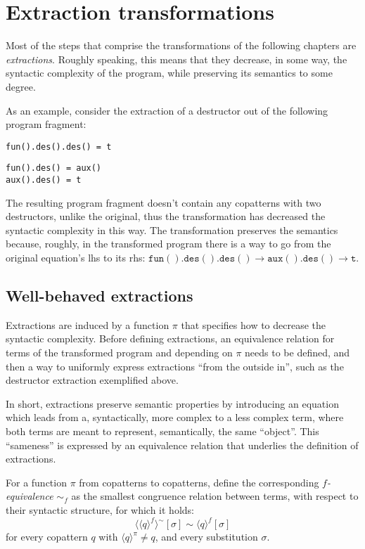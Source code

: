 \chapter{Extraction transformations}

Most of the steps that comprise the transformations of the following chapters are \textit{extractions}. Roughly speaking, this means that they decrease, in some way, the syntactic complexity of the program, while preserving its semantics to some degree.

As an example, consider the extraction of a destructor out of the following program fragment:
\begin{lstlisting}
fun().des().des() = t
\end{lstlisting}

\begin{lstlisting}
fun().des() = aux()
aux().des() = t
\end{lstlisting}
The resulting program fragment doesn't contain any copatterns with two destructors, unlike the original, thus the transformation has decreased the syntactic complexity in this way. The transformation preserves the semantics because, roughly, in the transformed program there is a way to go from the original equation's lhs to its rhs: $\mathtt{fun().des().des()} \longrightarrow \mathtt{aux().des()} \longrightarrow \mathtt{t}$.

\section{Well-behaved extractions}

Extractions are induced by a function $\pi$ that specifies how to decrease the syntactic complexity. Before defining extractions, an equivalence relation for terms of the transformed program and depending on $\pi$ needs to be defined, and then a way to uniformly express extractions ``from the outside in'', such as the destructor extraction exemplified above.

In short, extractions preserve semantic properties by introducing an equation which leads from a, syntactically, more complex to a less complex term, where both terms are meant to represent, semantically, the same ``object''. This ``sameness'' is expressed by an equivalence relation that underlies the definition of extractions.

\begin{definition}[$\pi$-equivalence]
For a function $\pi$ from copatterns to copatterns, define the corresponding \textit{$f$-equivalence} $\sim_f$ as the smallest congruence relation between terms, with respect to their syntactic structure, for which it holds:
\[
\langle \langle q \rangle^f \rangle^{\sim}[\sigma] \sim \langle q \rangle^f[\sigma]
\]
for every copattern $q$ with $\langle q \rangle^\pi \neq q$, and every substitution $\sigma$.
\end{definition}

